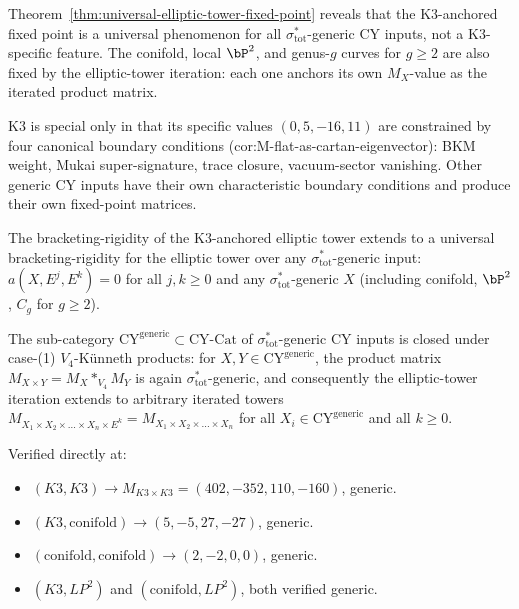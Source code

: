 \begin{remark}
\label{rem:K3-anchored-universal-extension}
Theorem~\ref{thm:universal-elliptic-tower-fixed-point} reveals that the
K$3$-anchored fixed point is a universal phenomenon for all
$\sigma_{\mathrm{tot}}^*$-generic CY inputs, not a K$3$-specific feature.
The conifold, local $\bP^2$, and genus-$g$ curves for $g \geq 2$ are also
fixed by the elliptic-tower iteration: each one anchors its own
$M_X$-value as the iterated product matrix.

K$3$ is special only in that its specific values $(0, 5, -16, 11)$ are
constrained by four canonical boundary conditions
\textup{(}cor:M-flat-as-cartan-eigenvector\textup{):} BKM weight, Mukai
super-signature, trace closure, vacuum-sector vanishing. Other generic
CY inputs have their own characteristic boundary conditions and produce
their own fixed-point matrices.

The bracketing-rigidity of the K$3$-anchored elliptic tower extends to
a universal bracketing-rigidity for the elliptic tower over any
$\sigma_{\mathrm{tot}}^*$-generic input:
$a(X, E^j, E^k) = 0$ for all $j, k \geq 0$ and any
$\sigma_{\mathrm{tot}}^*$-generic $X$ \textup{(}including conifold, $\bP^2$,
$C_g$ for $g \geq 2$\textup{).}
\end{remark}

\begin{proposition}
\label{prop:sigma-generic-closed-under-products}
The sub-category $\mathrm{CY}^{\mathrm{generic}} \subset \mathrm{CY}\text{-Cat}$
of $\sigma_{\mathrm{tot}}^*$-generic CY inputs is closed under case-(1)
$V_4$-Künneth products: for $X, Y \in \mathrm{CY}^{\mathrm{generic}}$, the
product matrix $M_{X \times Y} = M_X *_{V_4} M_Y$ is again
$\sigma_{\mathrm{tot}}^*$-generic, and consequently the elliptic-tower
iteration extends to arbitrary iterated towers
$M_{X_1 \times X_2 \times \ldots \times X_n \times E^k} =
M_{X_1 \times X_2 \times \ldots \times X_n}$ for all
$X_i \in \mathrm{CY}^{\mathrm{generic}}$ and all $k \geq 0$.

Verified directly at:
\begin{itemize}
 \item $(K3, K3) \to M_{K3 \times K3} = (402, -352, 110, -160)$, generic.
 \item $(K3, \mathrm{conifold}) \to (5, -5, 27, -27)$, generic.
 \item $(\mathrm{conifold}, \mathrm{conifold}) \to (2, -2, 0, 0)$, generic.
 \item $(K3, LP^2)$ and $(\mathrm{conifold}, LP^2)$, both verified generic.
\end{itemize}
\end{proposition}

